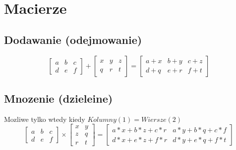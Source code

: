 \documentclass[a4paper]{article}
\begin{document}
\section{Macierze}
\subsection{Dodawanie (odejmowanie)}
\begin{equation}
    \begin{bmatrix}
        a & b & c\\
        d & e & f
        \end{bmatrix} +
        \begin{bmatrix}
            x & y & z \\
            q & r & t
        \end{bmatrix} =
        \begin{bmatrix}
            a+x & b+y & c +z \\
            d+q & e+r & f+t
        \end{bmatrix}
\end{equation}

\subsection{Mnozenie (dzieleine)}
Mozliwe tylko wtedy kiedy $Kolumny (1) = Wiersze(2)$
\begin{equation*}
    \begin{bmatrix}
        a & b & c\\
        d & e & f
        \end{bmatrix} \times
        \begin{bmatrix}
            x & y \\
            z & q \\
            r & t
        \end{bmatrix} =
        \begin{bmatrix}
            a*x + b*z + c *r & a*y + b * q + c * f  \\
            d*x + e * z + f *r & d* y + e * q + f*t
        \end{bmatrix}
\end{equation*}
\end{document}
